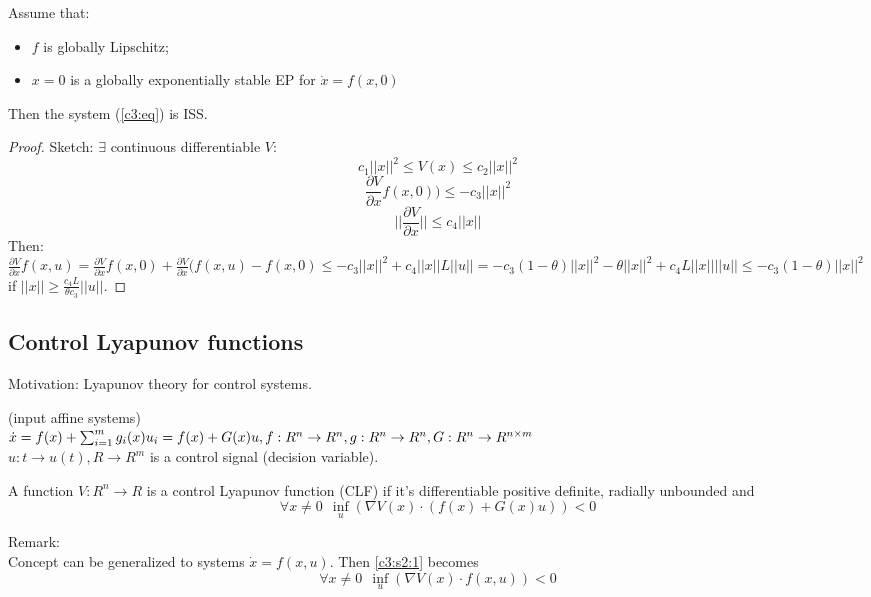 \begin{Theorem}
 Assume that:
 \begin{itemize}
     \item $f$ is globally Lipschitz;
     \item $x = 0$ is a globally exponentially stable EP for $\dot x = f(x,0)$
 \end{itemize}
 Then the system (\ref{c3:eq}) is ISS.
 
 \begin{proof}
 Sketch:
 $\exists$ continuous differentiable $V$:
 $$c_1||x||^2 \le V(x) \le c_2||x||^2$$
 $$ \frac{\partial V}{\partial x}f(x,0)) \le -c_3||x||^2$$
 $$||\frac{\partial V}{\partial x}|| \le c_4||x||$$
 Then: \\
  $\frac{\partial V}{\partial x}f(x,u)=\frac{\partial V}{\partial x}f(x,0)+\frac{\partial V}{\partial x}(f(x,u)-f(x,0) \le -c_3||x||^2+c_4||x||L||u|| = -c_3(1-\theta)||x||^2-\theta||x||^2+c_4L||x||||u|| \le -c_3(1-\theta)||x||^2$ \\
  if $||x|| \ge \frac{c_4L}{\theta c_3}||u||$.
 \end{proof}
\end{Theorem}

\subsection{Control Lyapunov functions}

Motivation: Lyapunov theory for control systems.

(input affine systems) \\
$\dot x = f(x) + \sum_{i=1}^{m}g_i(x)u_i = f(x) + G(x)u, \\ f:R^n \to R^n, g:R^n \to R^n, G:R^n \to R^{n \times m}$ \\
$u:t \to u(t), R \to R^m$ is a control signal (decision variable).

\begin{Definition}
 A function $V:R^n \to R$ is a control Lyapunov function (CLF) if it's differentiable positive definite, radially unbounded and 
 \begin{equation} \label{c3:s2:1}
     \forall x \neq 0 \ \ \inf_u (\nabla V(x) \cdot (f(x)+G(x)u)) < 0 
 \end{equation}
\end{Definition}

Remark: \\
Concept can be generalized to systems $\dot x = f(x,u)$. Then \ref{c3:s2:1} becomes
$$\forall x \neq 0 \ \ \inf_u (\nabla V(x) \cdot f(x,u)) < 0 $$

